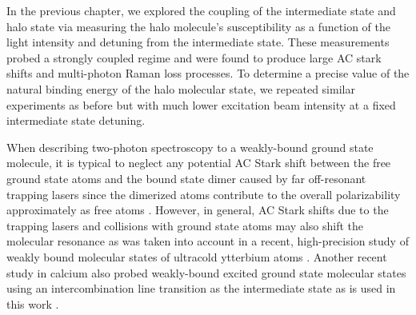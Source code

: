 
In the previous chapter, we explored the coupling of the intermediate state and halo state via measuring the halo molecule's susceptibility as a function of the light intensity and detuning from the intermediate state.
These measurements probed a strongly coupled regime and were found to produce large AC stark shifts and multi-photon Raman loss processes. 
To determine a precise value of the natural binding energy of the halo molecular state, we repeated similar experiments as before but with much lower excitation beam intensity at a fixed intermediate state detuning.

When describing two-photon spectroscopy to a weakly-bound ground state molecule, it is typical to neglect any potential AC Stark shift between the free ground state atoms and the bound state dimer caused by far off-resonant trapping lasers since the dimerized atoms contribute to the overall polarizability approximately as free atoms \cite{Jones2006}.
However, in general, AC Stark shifts due to the trapping lasers and collisions with ground state atoms may also shift the molecular resonance as was taken into account in a recent, high-precision study of weakly bound molecular states of ultracold ytterbium atoms \cite{bbc17}.
Another recent study in calcium also probed weakly-bound excited ground state molecular states using an intercombination line transition as the intermediate state as is used in this work \cite{Pachomow2017a}.

